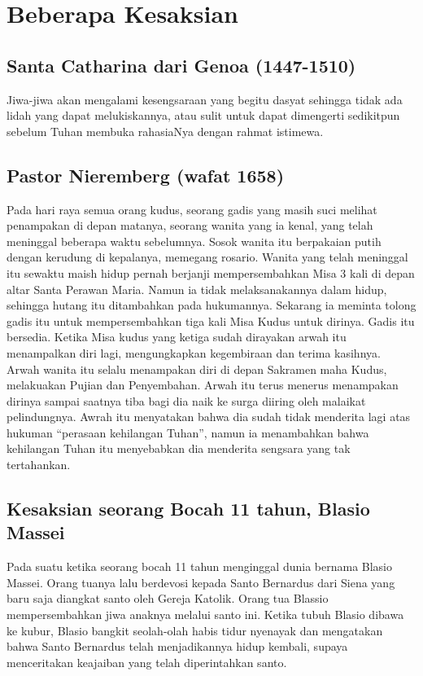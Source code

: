 \section*{Beberapa Kesaksian}

\subsection*{Santa Catharina dari Genoa (1447-1510)}

     Jiwa-jiwa akan mengalami kesengsaraan yang begitu dasyat sehingga tidak ada lidah yang dapat melukiskannya, atau sulit untuk dapat dimengerti sedikitpun sebelum Tuhan membuka rahasiaNya dengan rahmat istimewa.

\subsection*{Pastor Nieremberg (wafat 1658)} 

     Pada hari raya semua orang kudus, seorang gadis yang masih suci melihat penampakan di depan matanya, seorang wanita yang ia kenal, yang telah meninggal beberapa waktu sebelumnya. Sosok wanita itu berpakaian putih dengan kerudung di kepalanya, memegang rosario. Wanita yang telah meninggal itu sewaktu maish hidup pernah berjanji mempersembahkan Misa 3 kali di depan altar Santa Perawan Maria. Namun ia tidak melaksanakannya dalam hidup, sehingga hutang itu ditambahkan pada hukumannya. Sekarang ia meminta tolong gadis itu untuk mempersembahkan tiga kali Misa Kudus untuk dirinya. Gadis itu bersedia. Ketika Misa kudus yang ketiga sudah dirayakan arwah itu menampalkan diri lagi, mengungkapkan kegembiraan dan terima kasihnya. Arwah wanita itu selalu menampakan diri di depan Sakramen maha Kudus, melakuakan Pujian dan Penyembahan. Arwah itu terus menerus menampakan dirinya sampai saatnya tiba bagi dia naik ke surga diiring oleh malaikat pelindungnya. Awrah itu menyatakan bahwa dia sudah tidak menderita lagi atas hukuman “perasaan kehilangan Tuhan”, namun ia menambahkan bahwa kehilangan Tuhan itu menyebabkan dia menderita sengsara yang tak tertahankan.

\subsection*{Kesaksian seorang Bocah 11 tahun, Blasio Massei}           

     Pada suatu ketika seorang bocah 11 tahun menginggal dunia bernama Blasio Massei. Orang tuanya lalu berdevosi kepada Santo Bernardus dari Siena yang baru saja diangkat santo oleh Gereja Katolik. Orang tua Blassio mempersembahkan jiwa anaknya melalui santo ini. Ketika tubuh Blasio dibawa ke kubur, Blasio bangkit seolah-olah habis tidur nyenayak dan mengatakan bahwa Santo Bernardus telah menjadikannya hidup kembali, supaya menceritakan keajaiban yang telah diperintahkan santo.

